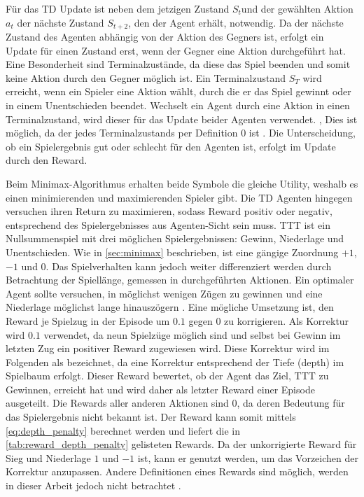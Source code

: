 Für das \ac{TD} Update ist neben dem jetzigen Zustand $S_t$und der gewählten Aktion $a_t$ der nächste Zustand $S_{t+2}$, den der Agent erhält, notwendig. 
Da der nächste Zustand des Agenten abhängig von der Aktion des Gegners ist, erfolgt ein Update für einen Zustand erst, wenn der Gegner eine Aktion durchgeführt hat. 
Eine Besonderheit sind Terminalzustände, da diese das Spiel beenden und somit keine Aktion durch den Gegner möglich ist. 
Ein Terminalzustand $S_T$ wird erreicht, wenn ein Spieler eine Aktion wählt, durch die er das Spiel gewinnt oder in einem Unentschieden beendet. 
Wechselt ein Agent durch eine Aktion in einen Terminalzustand, wird dieser für das Update beider Agenten verwendet. \cite[S. 2f]{vanderreeReinforcementLearningGame2013}, \cite{soemersd.GameAiHow}
Dies ist möglich, da der \qValue jedes Terminalzustands per Definition 0 ist \cite[S. 74]{suttonReinforcementLearningIntroduction2018}. 
Die Unterscheidung, ob ein Spielergebnis gut oder schlecht für den Agenten ist, erfolgt im Update durch den Reward.

Beim Minimax-Algorithmus erhalten beide Symbole die gleiche Utility, weshalb es einen minimierenden und maximierenden Spieler gibt.
Die \ac{TD} Agenten hingegen versuchen ihren Return zu maximieren, sodass Reward positiv oder negativ, entsprechend des Spielergebnisses aus Agenten-Sicht sein muss.
\acs{TTT} ist ein Nullsummenspiel mit drei möglichen Spielergebnissen: Gewinn, Niederlage und Unentschieden.
Wie in \cref{sec:minimax} beschrieben, ist eine gängige Zuordnung $+1$, $-1$ und $0$.
Das Spielverhalten kann jedoch weiter differenziert werden durch Betrachtung der Spiellänge, gemessen in durchgeführten Aktionen. 
Ein optimaler Agent sollte versuchen, in möglichst wenigen Zügen zu gewinnen und eine Niederlage möglichst lange hinauszögern \cite[S. 533]{crowleyFlexibleStrategyUse1993}. 
Eine mögliche Umsetzung ist, den Reward je Spielzug in der Episode um $0.1$ gegen $0$ zu korrigieren.
Als Korrektur wird $0.1$ verwendet, da neun Spielzüge möglich sind und selbst bei Gewinn im letzten Zug ein positiver Reward zugewiesen wird.
Diese Korrektur wird im Folgenden als  bezeichnet, da eine Korrektur entsprechend der Tiefe (\engl depth) im Spielbaum erfolgt.
Dieser Reward bewertet, ob der Agent das Ziel, \acs{TTT} zu Gewinnen, erreicht hat und wird daher als letzter Reward einer Episode ausgeteilt.
Die Rewards aller anderen Aktionen sind 0, da deren Bedeutung für das Spielergebnis nicht bekannt ist. 
Der Reward kann somit mittels \cref{eq:depth_penalty} berechnet werden und  liefert die in \cref{tab:reward_depth_penalty} gelisteten Rewards.
Da der unkorrigierte Reward für Sieg und Niederlage $1$ und $-1$ ist, kann er genutzt werden, um das Vorzeichen der Korrektur anzupassen.
Andere Definitionen eines Rewards sind möglich, werden in dieser Arbeit jedoch nicht betrachtet \cite{mirnovi.QLearningTicTacToe2020}.

